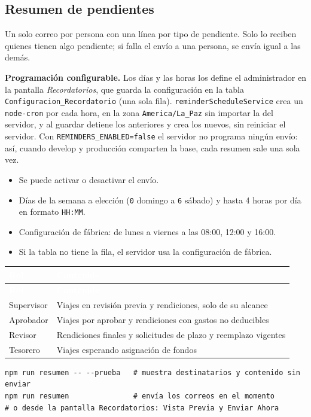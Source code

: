 \documentclass[11pt,letterpaper]{article}
\newcommand{\cabecera}{\rowcolor{maxamPrimario}}
\newcommand{\tth}[1]{\textcolor{white}{\textbf{#1}}}
\newcommand{\code}[1]{\nolinkurl{#1}}
\begin{document}
\subsection{Resumen de pendientes}
Un solo correo por persona con una línea por tipo de pendiente. Solo lo reciben quienes tienen algo pendiente; si falla el envío a una persona, se envía igual a las demás.

\textbf{Programación configurable.} Los días y las horas los define el administrador en la pantalla \emph{Recordatorios}, que guarda la configuración en la tabla \code{Configuracion_Recordatorio} (una sola fila). \code{reminderScheduleService} crea un \code{node-cron} por cada hora, en la zona \code{America/La_Paz} sin importar la del servidor, y al guardar detiene los anteriores y crea los nuevos, sin reiniciar el servidor. Con \code{REMINDERS_ENABLED=false} el servidor no programa ningún envío: así, cuando develop y producción comparten la base, cada resumen sale una sola vez.

\begin{itemize}
  \item Se puede activar o desactivar el envío.
  \item Días de la semana a elección (\code{0} domingo a \code{6} sábado) y hasta 4 horas por día en formato \code{HH:MM}.
  \item Configuración de fábrica: de lunes a viernes a las 08:00, 12:00 y 16:00.
  \item Si la tabla no tiene la fila, el servidor usa la configuración de fábrica.
\end{itemize}

\begin{xltabular}{\textwidth}{L{2.6cm} Y}
\cabecera \tth{Rol} & \tth{Contenido} \\
\endfirsthead
\cabecera \tth{Rol} & \tth{Contenido} \\
\endhead
{} Supervisor & Viajes en revisión previa y rendiciones, solo de su alcance \\
Aprobador & Viajes por aprobar y rendiciones con gastos no deducibles \\
 Revisor & Rendiciones finales y solicitudes de plazo y reemplazo vigentes \\
Tesorero & Viajes esperando asignación de fondos \\
\end{xltabular}

\begin{lstlisting}
npm run resumen -- --prueba   # muestra destinatarios y contenido sin enviar
npm run resumen               # envía los correos en el momento
# o desde la pantalla Recordatorios: Vista Previa y Enviar Ahora
\end{lstlisting}
\end{document}
